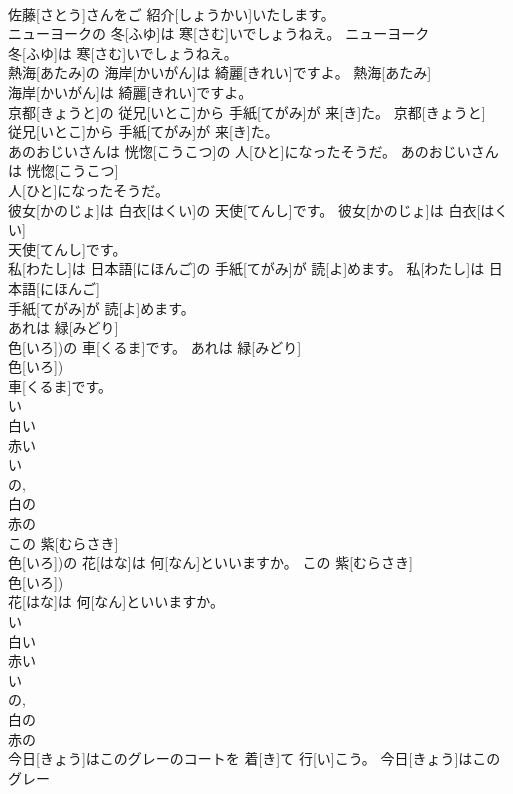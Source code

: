 \documentclass[8pt]{extreport}
\begin{document}
\begin{CJK}{UTF8}{min}
\\	佐藤[さとう]さんをご 紹介[しょうかい]いたします。	
\\	ニューヨークの 冬[ふゆ]は 寒[さむ]いでしょうねえ。	ニューヨーク
\\	冬[ふゆ]は 寒[さむ]いでしょうねえ。	
\\	熱海[あたみ]の 海岸[かいがん]は 綺麗[きれい]ですよ。	熱海[あたみ]
\\	海岸[かいがん]は 綺麗[きれい]ですよ。	
\\	京都[きょうと]の 従兄[いとこ]から 手紙[てがみ]が 来[き]た。	京都[きょうと]
\\	従兄[いとこ]から 手紙[てがみ]が 来[き]た。	
\\	あのおじいさんは 恍惚[こうこつ]の 人[ひと]になったそうだ。	あのおじいさんは 恍惚[こうこつ]
\\	人[ひと]になったそうだ。	
\\	彼女[かのじょ]は 白衣[はくい]の 天使[てんし]です。	彼女[かのじょ]は 白衣[はくい]
\\	天使[てんし]です。	
\\	私[わたし]は 日本語[にほんご]の 手紙[てがみ]が 読[よ]めます。	私[わたし]は 日本語[にほんご]
\\	手紙[てがみ]が 読[よ]めます。	
\\	あれは 緑[みどり]
\\	色[いろ])の 車[くるま]です。	あれは 緑[みどり]
\\	色[いろ])
\\	車[くるま]です。	
\\	い 
\\	白い 
\\	赤い 
\\	い 
\\	の, 
\\	白の 
\\	赤の
\\	この 紫[むらさき]
\\	色[いろ])の 花[はな]は 何[なん]といいますか。	この 紫[むらさき]
\\	色[いろ])
\\	花[はな]は 何[なん]といいますか。	
\\	い 
\\	白い 
\\	赤い 
\\	い 
\\	の, 
\\	白の 
\\	赤の
\\	今日[きょう]はこのグレーのコートを 着[き]て 行[い]こう。	今日[きょう]はこのグレー

\end{CJK}
\end{document}

